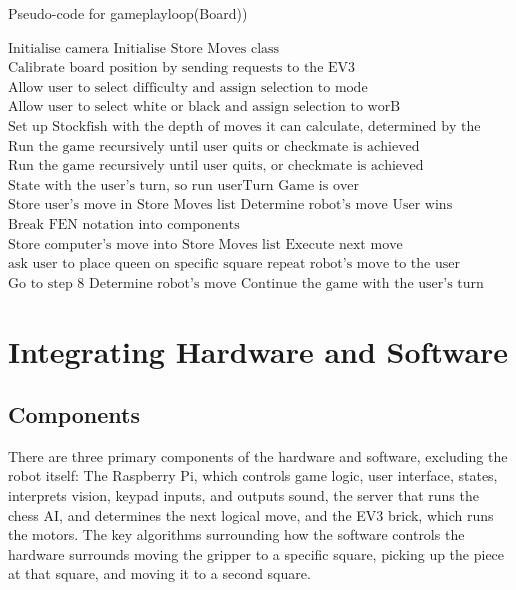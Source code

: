 \documentclass[onecolumn]{IEEEtran}
\begin{document}
\begin{algorithm}[h!]
\caption{Pseudo-code for gameplayloop(Board))}
\begin{algorithmic}[1]
\STATE $\text{Initialise camera}$
\STATE $\text{Initialise Store Moves class}$ 
\STATE $\text{Calibrate board position by sending requests to the EV3}$
\STATE $\text{Allow user to select difficulty and assign selection to mode}$
\STATE $\text{Allow user to select white or black and assign selection to worB}$
\STATE $\text{Set up Stockfish with the depth of moves it can calculate, determined by the difficulty level}$
\STATE $\text{Run the game recursively until user quits or checkmate is achieved}$
	\STATE $\text{Run the game recursively until user quits, or checkmate is achieved}$
	\STATE $\text{State with the user's turn, so run userTurn}$
		\STATE $\text{Game is over}$
		\ELSE
		\STATE $\text{Store user's move in Store Moves list}$
		\STATE $\text{Determine robot's move}$
			\STATE $\text{User wins}$
			\ELSE
			\STATE $\text{Break FEN notation into components}$
			\STATE $\text{Store computer's move into Store Moves list}$
			\STATE $\text{Execute next move}$
				\STATE $\text{ask user to place queen on specific square}$
			\ENDIF
			\STATE $\text{repeat robot's move to the user}$
		\ENDIF
	\ENDIF
	\STATE $\text{Go to step 8}$
	\ELSE {}
	\STATE $\text{Determine robot's move}$ 
	\STATE $\text{Continue the game with the user's turn}$ 
\ENDIF
\end{algorithmic}
\end{algorithm}


\section{Integrating Hardware and Software}
\subsection{Components}
There are three primary components of the hardware and software, excluding the robot itself: The Raspberry Pi, which controls game logic, user interface, states, interprets vision, keypad inputs, and outputs sound, the server that runs the chess AI, and determines the next logical move, and the EV3 brick, which runs the motors. The key algorithms surrounding how the software controls the hardware surrounds moving the gripper to a specific square, picking up the piece at that square, and moving it to a second square. 
\end{document}
